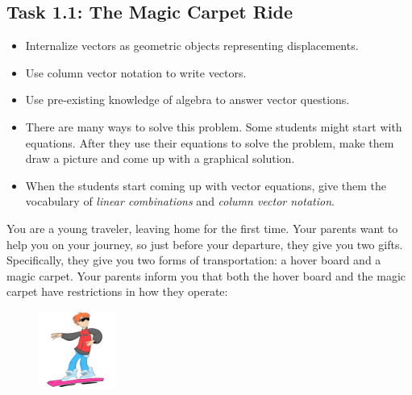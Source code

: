 \documentclass{problemset}
\begin{document}
\setcounter{page}{1}
\begin{iola}
\section*{Task 1.1: The Magic Carpet Ride}


\begin{annotation}
	\begin{goals}
		\begin{itemize}
			\item Internalize vectors as geometric objects representing
				displacements.

			\item Use column vector notation to write vectors.

			\item Use pre-existing knowledge of algebra to answer vector
				questions.
		\end{itemize}
	\end{goals}
	\begin{notes}

		\begin{itemize}
			\item There are many ways to solve this problem.
				Some students
				might start with equations. After they use their
				equations to solve the problem, make them draw a picture
				and come up with a graphical solution.

			\item When the students start coming up with vector equations,
				give them the vocabulary of \emph{linear
				combinations}
				and \emph{column vector notation}.
		\end{itemize}
	\end{notes}
\end{annotation}
You are a young traveler, leaving home for the first time. Your parents
want to help you on your journey, so just before your departure, they give you two
gifts. Specifically, they give you two forms of transportation: a hover board and
a magic carpet. Your parents inform you that both the hover board and the magic carpet
have restrictions in how they operate:

\begin{minipage}{\textwidth}
	\vspace{.5cm}
	\begin{figure}
	\vspace{-.8cm}
	\includegraphics[width=1in]{images/HoverBoard-small.png}
	\end{figure}


\end{minipage}
\end{iola}
\end{document}
